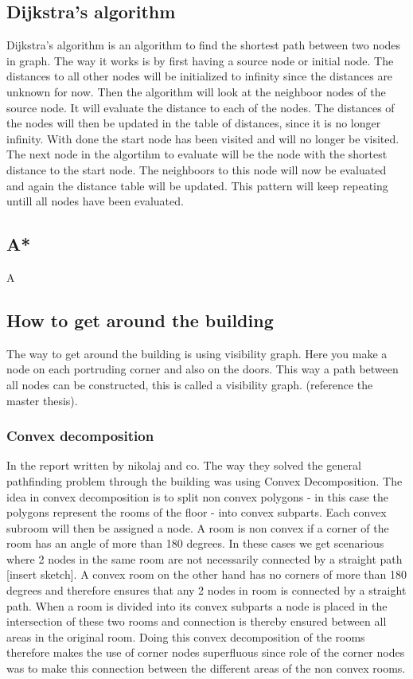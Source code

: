 \subsection{Dijkstra's algorithm}
Dijkstra's algorithm is an algorithm to find the shortest path between two nodes in graph. The way it works is by first having a source node or initial node. The distances to all other nodes will be initialized to infinity since the distances are unknown for now. Then the algorithm will look at the neighboor nodes of the source node. It will evaluate the distance to each of the nodes. The distances of the nodes will then be updated in the table of distances, since it is no longer infinity. With done the start node has been visited and will no longer be visited. The next node in the algortihm to evaluate will be the node with the shortest distance to the start node. The neighboors to this node will now be evaluated and again the distance table will be updated. This pattern will keep repeating untill all nodes have been evaluated. 

\subsection{A*}
A

\subsection{How to get around the building}
The way to get around the building is using visibility graph. Here you make a node on each portruding corner and also on the doors. This way a path between all nodes can be constructed, this is called a visibility graph.
(reference the master thesis).

\subsubsection{Convex decomposition}
In the report written by nikolaj and co. The way they solved the general pathfinding problem through the building was using Convex Decomposition. The idea in convex decomposition is to split non convex polygons - in this case the polygons represent the rooms of the floor - into convex subparts. Each convex subroom will then be assigned a node. A room is non convex if a corner of the room has an angle of more than 180 degrees. In these cases we get scenarious where 2 nodes in the same room are not necessarily connected by a straight path [insert sketch]. A convex room on the other hand has no corners of more than 180 degrees and therefore ensures that any 2 nodes in room is connected by a straight path. 
When a room is divided into its convex subparts a node is placed in the intersection of these two rooms and connection is thereby ensured between all areas in the original room.
Doing this convex decomposition of the rooms therefore makes the use of corner nodes superfluous since role of the corner nodes was to make this connection between the different areas of the non convex rooms.

